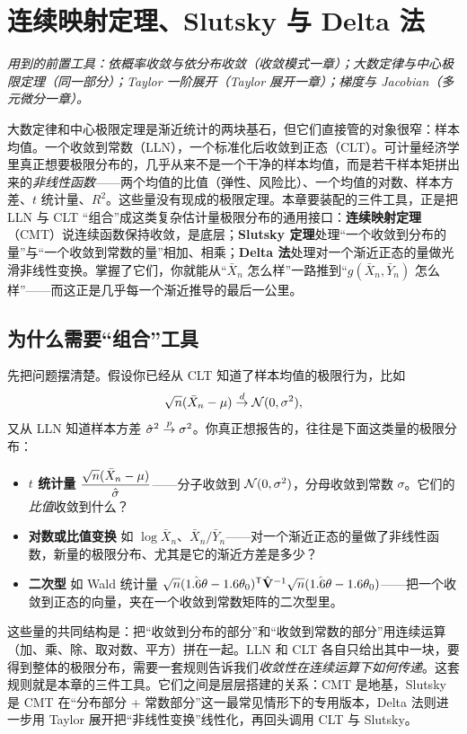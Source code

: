 \chapter{连续映射定理、Slutsky 与 Delta 法}
\label{ch:slutsky}

\noindent\emph{用到的前置工具：依概率收敛与依分布收敛（收敛模式一章）；大数定律与中心极限定理（同一部分）；Taylor 一阶展开（Taylor 展开一章）；梯度与 Jacobian（多元微分一章）。}
\medskip

大数定律和中心极限定理是渐近统计的两块基石，但它们直接管的对象很窄：样本均值。一个收敛到常数（LLN），一个标准化后收敛到正态（CLT）。可计量经济学里真正想要极限分布的，几乎从来不是一个干净的样本均值，而是若干样本矩拼出来的\emph{非线性函数}——两个均值的比值（弹性、风险比）、一个均值的对数、样本方差、$t$ 统计量、$R^2$。这些量没有现成的极限定理。本章要装配的三件工具，正是把 LLN 与 CLT ``组合''成这类复杂估计量极限分布的通用接口：\textbf{连续映射定理}（CMT）说连续函数保持收敛，是底层；\textbf{Slutsky 定理}处理``一个收敛到分布的量''与``一个收敛到常数的量''相加、相乘；\textbf{Delta 法}处理对一个渐近正态的量做光滑非线性变换。掌握了它们，你就能从``$\bar X_n$ 怎么样''一路推到``$g(\bar X_n,\bar Y_n)$ 怎么样''——而这正是几乎每一个渐近推导的最后一公里。

\section{为什么需要``组合''工具}
\label{sec:slutsky-motivation}

先把问题摆清楚。假设你已经从 CLT 知道了样本均值的极限行为，比如
\[
    \sqrt{n}(\bar X_n-\mu)\overset{d}{\to}\mathcal{N}(0,\sigma^2),
\]
又从 LLN 知道样本方差 $\hat\sigma^2\overset{p}{\to}\sigma^2$。你真正想报告的，往往是下面这类量的极限分布：

\begin{itemize}
    \item \textbf{$t$ 统计量} $\dfrac{\sqrt{n}(\bar X_n-\mu)}{\hat\sigma}$——分子收敛到 $\mathcal{N}(0,\sigma^2)$，分母收敛到常数 $\sigma$。它们的\emph{比值}收敛到什么？
    \item \textbf{对数或比值变换} 如 $\log\bar X_n$、$\bar X_n/\bar Y_n$——对一个渐近正态的量做了非线性函数，新量的极限分布、尤其是它的渐近方差是多少？
    \item \textbf{二次型} 如 Wald 统计量 $\sqrt{n}(\hat{1.6\theta}-1.6\theta_0)^{\mathsf{T}}{\hat{\mathbf{V}}}^{-1}\sqrt{n}(\hat{1.6\theta}-1.6\theta_0)$——把一个收敛到正态的向量，夹在一个收敛到常数矩阵的二次型里。
\end{itemize}

这些量的共同结构是：把``收敛到分布的部分''和``收敛到常数的部分''用连续运算（加、乘、除、取对数、平方）拼在一起。LLN 和 CLT 各自只给出其中一块，要得到整体的极限分布，需要一套规则告诉我们\emph{收敛性在连续运算下如何传递}。这套规则就是本章的三件工具。它们之间是层层搭建的关系：CMT 是地基，Slutsky 是 CMT 在``分布部分 + 常数部分''这一最常见情形下的专用版本，Delta 法则进一步用 Taylor 展开把``非线性变换''线性化，再回头调用 CLT 与 Slutsky。

